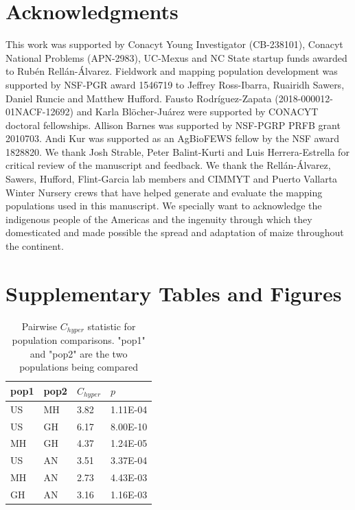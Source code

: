 \documentclass[9pt,twocolumn,twoside,lineno]{biorxiv}
\begin{document}
\section{Acknowledgments}
This work was supported by Conacyt Young Investigator (CB-238101), Conacyt National Problems (APN-2983), UC-Mexus and NC State startup funds awarded to Rubén Rellán-Álvarez. 
Fieldwork and mapping population development was supported by NSF-PGR award 1546719 to Jeffrey Ross-Ibarra, Ruairidh Sawers, Daniel Runcie and Matthew Hufford.  
Fausto Rodríguez-Zapata (2018-000012-01NACF-12692) and Karla Blöcher-Juárez were supported by CONACYT doctoral fellowships.
Allison Barnes was supported by NSF-PGRP PRFB grant 2010703. 
Andi Kur was supported as an AgBioFEWS fellow by the NSF award 1828820.
We thank Josh Strable, Peter Balint-Kurti and Luis Herrera-Estrella for critical review of the manuscript and feedback. 
We thank the Rellán-Álvarez, Sawers, Hufford, Flint-Garcia lab members and CIMMYT and Puerto Vallarta Winter Nursery crews that have helped generate and evaluate the mapping populations used in this manuscript.
We specially want to acknowledge the indigenous people of the Americas and the  ingenuity through which they domesticated and made possible the spread and adaptation of maize throughout the continent. 
\label{sec:acknowledgments}

\typeout{}


\clearpage

\onecolumn

\section*{Supplementary Tables and Figures}

\begin{table}[h!]

\begin{tabular}{@{}llll@{}}
\toprule
pop1 & pop2 & $C_{hyper}$   & $p$  \\ \midrule
US   & MH   & 3.82 & 1.11E-04 \\
US   & GH   & 6.17 & 8.00E-10 \\
MH   & GH   & 4.37 & 1.24E-05 \\
US   & AN   & 3.51 & 3.37E-04 \\
MH   & AN   & 2.73 & 4.43E-03 \\
GH   & AN   & 3.16 & 1.16E-03 \\ \bottomrule
\end{tabular}
\label{tab:table1}
\caption{Pairwise $C_{hyper}$ statistic for population comparisons. "pop1" and "pop2" are the two populations being compared}
\end{table}
\end{document}
